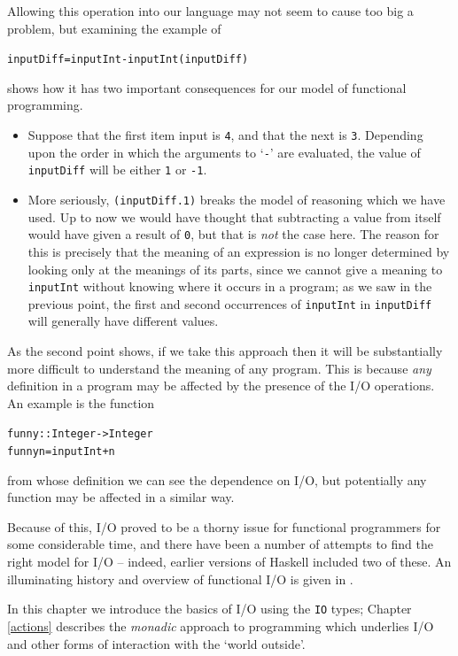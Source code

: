 Allowing this operation into our language 
may not seem to cause too big a problem, but examining the example of
\begin{alltt}
inputDiff = inputInt - inputInt\hfill(inputDiff)
\end{alltt}
shows how it has two important consequences for our model of functional programming. 
\begin{itemize}
\item Suppose that the first item input is \texttt{4}, and that the next
is \texttt{3}. Depending upon the order in which the arguments to
`\texttt{-}' are evaluated, the value of \texttt{inputDiff} will be
either \texttt{1} or \texttt{-1}.
\item More seriously, \texttt{(inputDiff.1)} breaks the model of
reasoning which we have used. Up to now we would have thought that
subtracting a value from itself would have given a result of \texttt{0}, but that is
{\em not\/} the case here. 
\itempar
The reason for this is precisely that the meaning of an expression is
no longer determined by looking only at the meanings of its parts, since we cannot 
give a meaning to
\texttt{inputInt} without knowing where it occurs in a program; as we
saw in the previous point, the first and second occurrences of
\texttt{inputInt} in
\texttt{inputDiff} will generally have different values.
\end{itemize}
As the second point shows, if we take this approach then it will be
substantially more difficult to understand the meaning of any program. 
This is because {\em any\/} definition in a
program may be affected by the presence of the I/O operations. An
example is the function
\begin{alltt}
funny :: Integer -> Integer
funny n = inputInt + n
\end{alltt}
from whose definition we can see the dependence on I/O, but potentially
any function may be affected in a similar way.

Because of this, I/O proved to be a thorny issue for functional programmers
for some considerable time, and there have been a number of attempts to find the right
model for I/O -- indeed, earlier versions of Haskell included two of
these. An illuminating history and overview of functional I/O is given in
. 

In this chapter we introduce the basics of I/O using the \texttt{IO} types; Chapter \ref{actions}  describes the \emph{monadic} approach to programming which underlies I/O and other forms of interaction with the `world outside'. 

